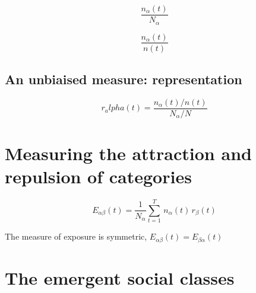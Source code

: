 \begin{equation}
    \frac{n_\alpha(t)}{N_\alpha}
\end{equation}


\begin{equation}
    \frac{n_\alpha(t)}{n(t)}
\end{equation}

\subsection{An unbiaised measure: representation}
\label{sub:an_unbiaised_measure_the_representation}

\begin{equation}
    r_alpha(t) = \frac{n_\alpha(t)/n(t)}{N_\alpha/N}
\end{equation}

\section{Measuring the attraction and repulsion of categories}
\label{sec:measuring_the_attraction_and_repulsion_of_categories}

\begin{equation}
    E_{\alpha \beta}(t) = \frac{1}{N_\alpha}
    \sum_{t=1}^T\,n_\alpha(t)\,r_\beta(t) 
\end{equation}

The measure of exposure is symmetric, $E_{\alpha \beta}(t) = E_{\beta \alpha}(t)$

\section{The emergent social classes}
\label{sec:the_emergent_social_classes}


